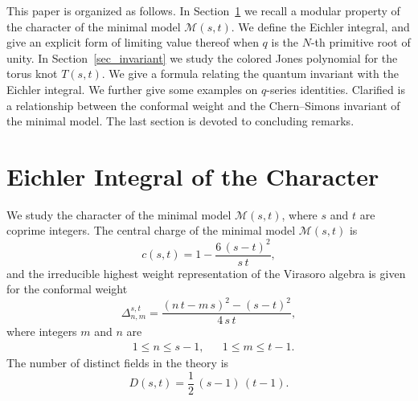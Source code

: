 \documentclass[12pt,reqno]{amsart}
\begin{document}
This paper is organized as follows.
In Section~\ref{sec:character} we recall a modular property of the
character of the minimal model $\mathcal{M}(s,t)$.
We define the Eichler integral, and give an explicit form
of limiting value thereof when $q$ is the $N$-th primitive root of unity.
In Section~\ref{sec_invariant}
we study the colored Jones polynomial for the torus knot $T(s,t)$.
We give a formula relating the quantum invariant with the Eichler
integral.
We further give some examples on $q$-series identities.
Clarified is a relationship between the conformal weight and the
Chern--Simons invariant of the minimal model.
The last section is devoted to concluding remarks.




\section{Eichler Integral of the  Character}
\label{sec:character}

We study the character of the minimal model $\mathcal{M}(s,t)$, where
$s$ and $t$ are coprime integers.
The central charge of the minimal model $\mathcal{M}(s, t)$  is
\begin{equation}
  c(s,t) = 1 - \frac{6 \, (s-t)^2}{s \, t} ,
\end{equation}
and the irreducible highest weight representation of the Virasoro
algebra is given for the conformal weight
\begin{equation}
  \Delta^{s,t}_{n,m}
  =
  \frac{(n \, t - m \, s)^2 - (s-t)^2}{4 \, s \, t} ,
\end{equation}
where integers $m$ and $n$ are
\begin{align*}
  & 1 \leq n \leq s-1,
  &
  & 1 \leq m \leq t- 1.
\end{align*}
The number of distinct fields in the theory is 
\begin{equation}
  D(s,t) = \frac{1}{2} \, (s-1 ) \, (t-1) .
\end{equation}
\end{document}
